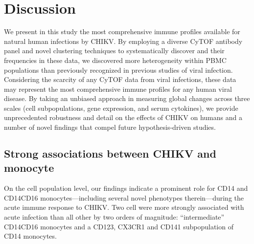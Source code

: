 \section{Discussion}

We present in this study the most comprehensive immune profiles available for natural human infections by CHIKV. By employing a diverse CyTOF antibody panel and novel clustering techniques to systematically discover \subcommunities{} and their frequencies in these data, we discovered more heterogeneity within PBMC populations than previously recognized in previous studies of viral infection. Considering the scarcity of any CyTOF data from viral infections,\autocite{Miner2015,Sen2015} these data may represent the most comprehensive immune profiles for any human viral disease. By taking an unbiased approach in measuring global changes across three scales (cell subpopulations, gene expression, and serum cytokines), we provide unprecedented robustness and detail on the effects of CHIKV on humans and a number of novel findings that compel future hypothesis-driven studies.

\subsection{Strong associations between CHIKV and monocyte \subcommunities{}}

On the cell population level, our findings indicate a prominent role for CD14\sups{+} and CD14\sups{+}\allowbreak CD16\sups{+} monocytes—including several novel phenotypes therein—during the acute immune response to CHIKV. Two cell \subcommunities{} were more strongly associated with acute infection than all other \subcommunities{} by two orders of magnitude: “intermediate” CD14\sups{++}\allowbreak CD16\sups{+} monocytes and a CD123\sups{+}, CX3CR1\sups{+} and CD141\sups{+} subpopulation of CD14\sups{+} monocytes.	

